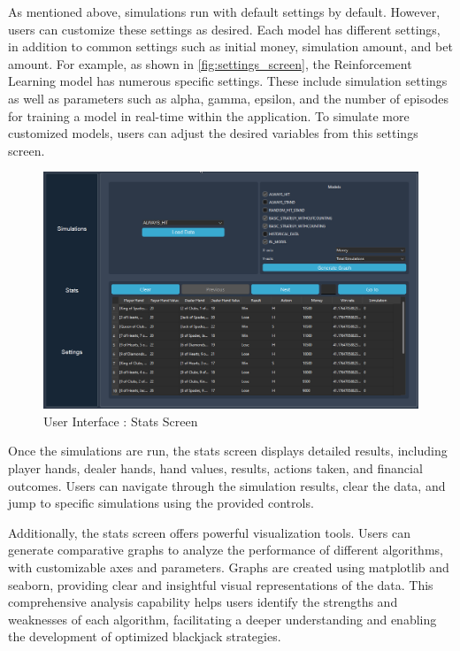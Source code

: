 \documentclass[a4paper,12pt]{report}
\begin{document}
As mentioned above, simulations run with default settings by default. However, users can customize these settings as desired. Each model has different settings, in addition to common settings such as initial money, simulation amount, and bet amount. For example, as shown in \ref{fig:settings_screen}, the Reinforcement Learning model has numerous specific settings. These include simulation settings as well as parameters such as alpha, gamma, epsilon, and the number of episodes for training a model in real-time within the application. To simulate more customized models, users can adjust the desired variables from this settings screen.

\begin{figure}[htbp]
\begin{center}
\includegraphics[scale=0.35]{stats screen.png}
\end{center}
\caption{User Interface : Stats Screen}
\label{fig:stats_screen}
\end{figure}

Once the simulations are run, the stats screen displays detailed results, including player hands, dealer hands, hand values, results, actions taken, and financial outcomes. Users can navigate through the simulation results, clear the data, and jump to specific simulations using the provided controls.

Additionally, the stats screen offers powerful visualization tools. Users can generate comparative graphs to analyze the performance of different algorithms, with customizable axes and parameters. Graphs are created using matplotlib and seaborn, providing clear and insightful visual representations of the data. This comprehensive analysis capability helps users identify the strengths and weaknesses of each algorithm, facilitating a deeper understanding and enabling the development of optimized blackjack strategies.
\end{document}
